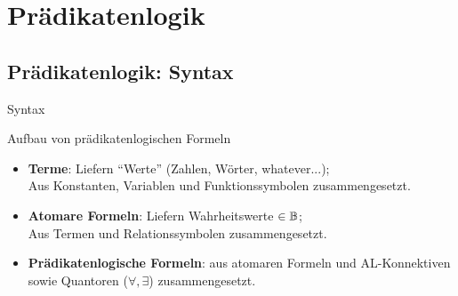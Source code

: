 \section{Prädikatenlogik}
\newcommand{\plB}{\plfoo{B}}
\newcommand{\plE}{\plfoo{E}}

\subsection{Prädikatenlogik: Syntax}

\begin{frame}{Syntax}
	\begin{block}{Aufbau von prädikatenlogischen Formeln}
	\begin{itemize}[<+->]
		\item \textbf{Terme}: Liefern \enquote{Werte} (Zahlen, Wörter, whatever...); \\ 
		Aus Konstanten, Variablen und Funktionssymbolen zusammengesetzt.
		\item \textbf{Atomare Formeln}: Liefern Wahrheitswerte $\in \mathbb{B}$; \\
		 Aus Termen und Relationssymbolen zusammengesetzt.
		\item \textbf{Prädikatenlogische Formeln}: aus atomaren Formeln und AL-Konnektiven sowie Quantoren ($\forall, \exists$) zusammengesetzt. 
	\end{itemize}
	\end{block}
\end{frame}

